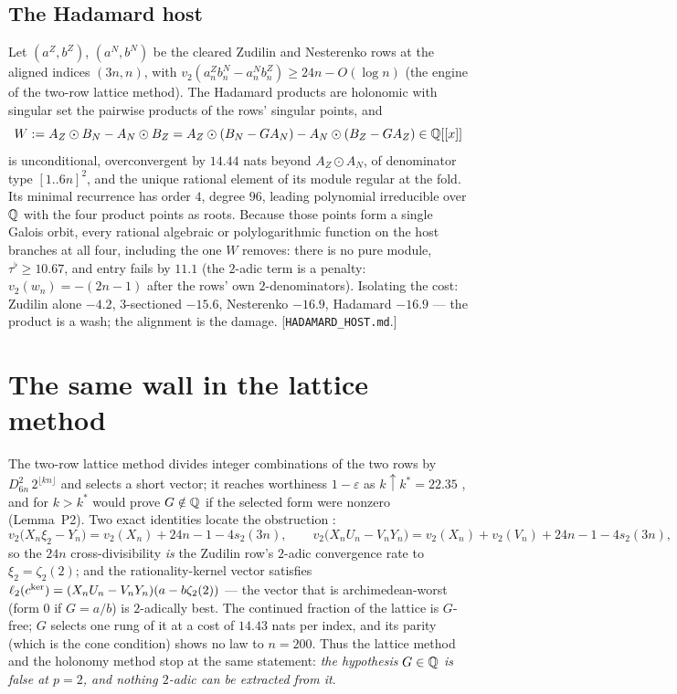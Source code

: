 \documentclass[11pt]{amsart}
\theoremstyle{remark}
\begin{document}
\subsection{The Hadamard host} Let $(a^Z,b^Z)$, $(a^N,b^N)$ be the cleared Zudilin and Nesterenko rows at the aligned indices $(3n,n)$, with $v_2(a^Z_nb^N_n-a^N_nb^Z_n)\ge24n-O(\log n)$ (the engine of the two-row lattice method). The Hadamard products are holonomic with singular set the pairwise products of the rows' singular points, and
\[W:=A_Z\odot B_N-A_N\odot B_Z=A_Z\odot(B_N-GA_N)-A_N\odot(B_Z-GA_Z)\in\mathbb Q[[x]]\]
is unconditional, overconvergent by $14.44$ nats beyond $A_Z\odot A_N$, of denominator type $[1..6n]^2$, and the unique rational element of its module regular at the fold. Its minimal recurrence has order $4$, degree $96$, leading polynomial irreducible over $\mathbb Q$ with the four product points as roots. Because those points form a single Galois orbit, every rational algebraic or polylogarithmic function on the host branches at all four, including the one $W$ removes: there is no pure module, $\tau^\flat\ge10.67$, and entry fails by $11.1$ (the $2$-adic term is a penalty: $v_2(w_n)=-(2n-1)$ after the rows' own $2$-denominators). Isolating the cost: Zudilin alone $-4.2$, $3$-sectioned $-15.6$, Nesterenko $-16.9$, Hadamard $-16.9$ --- the product is a wash; the alignment is the damage. [\texttt{HADAMARD\_HOST.md}.]

\section{The same wall in the lattice method}
The two-row lattice method divides integer combinations of the two rows by $D_{6n}^2\,2^{\lfloor kn\rfloor}$ and selects a short vector; it reaches worthiness $1-\varepsilon$ as $k\uparrow k^*=22.35$ \cite{Lean,OneEps}, and for $k>k^*$ would prove $G\notin\mathbb Q$ if the selected form were nonzero (Lemma~P2). Two exact identities locate the obstruction \cite[\texttt{P2\_HOLONOMIC.md}]{proj}:
\[v_2\bigl(X_n\xi_2-Y_n\bigr)=v_2(X_n)+24n-1-4s_2(3n),\qquad v_2\bigl(X_nU_n-V_nY_n\bigr)=v_2(X_n)+v_2(V_n)+24n-1-4s_2(3n),\]
so the $24n$ cross-divisibility \emph{is} the Zudilin row's $2$-adic convergence rate to $\xi_2=\zeta_2(2)$; and the rationality-kernel vector satisfies $\ell_2(c^{\rm ker})=(X_nU_n-V_nY_n)(a-b\zeta_2(2))$ --- the vector that is archimedean-worst (form $0$ if $G=a/b$) is $2$-adically best. The continued fraction of the lattice is $G$-free; $G$ selects one rung of it at a cost of $14.43$ nats per index, and its parity (which is the cone condition) shows no law to $n=200$. Thus the lattice method and the holonomy method stop at the same statement: \emph{the hypothesis $G\in\mathbb Q$ is false at $p=2$, and nothing $2$-adic can be extracted from it}.
\end{document}
